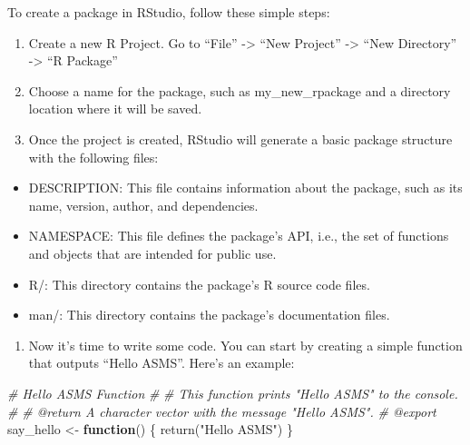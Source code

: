 \documentclass[
]{book}
\newenvironment{Shaded}{\begin{snugshade}}{\end{snugshade}}
\newcommand{\CommentTok}[1]{\textcolor[rgb]{0.56,0.35,0.01}{\textit{#1}}}
\newcommand{\ControlFlowTok}[1]{\textcolor[rgb]{0.13,0.29,0.53}{\textbf{#1}}}
\newcommand{\FunctionTok}[1]{\textcolor[rgb]{0.00,0.00,0.00}{#1}}
\newcommand{\NormalTok}[1]{#1}
\newcommand{\OtherTok}[1]{\textcolor[rgb]{0.56,0.35,0.01}{#1}}
\newcommand{\StringTok}[1]{\textcolor[rgb]{0.31,0.60,0.02}{#1}}
\providecommand{\tightlist}{%
  \setlength{\itemsep}{0pt}\setlength{\parskip}{0pt}}
\begin{document}
To create a package in RStudio, follow these simple steps:

\begin{enumerate}
\def\labelenumi{\arabic{enumi}.}
\tightlist
\item
  Create a new R Project. Go to ``File'' -\textgreater{} ``New Project'' -\textgreater{} ``New Directory'' -\textgreater{} ``R Package''
\item
  Choose a name for the package, such as my\_new\_rpackage and a directory location where it will be saved.
\item
  Once the project is created, RStudio will generate a basic package structure with the following files:
\end{enumerate}

\begin{itemize}
\tightlist
\item
  DESCRIPTION: This file contains information about the package, such as its name, version, author, and dependencies.
\item
  NAMESPACE: This file defines the package's API, i.e., the set of functions and objects that are intended for public use.
\item
  R/: This directory contains the package's R source code files.
\item
  man/: This directory contains the package's documentation files.
\end{itemize}

\begin{enumerate}
\def\labelenumi{\arabic{enumi}.}
\tightlist
\item
  Now it's time to write some code. You can start by creating a simple function that outputs ``Hello ASMS''. Here's an example:
\end{enumerate}

\begin{Shaded}
\begin{Highlighting}[]
\CommentTok{\#\textquotesingle{} Hello ASMS Function}
\CommentTok{\#\textquotesingle{}}
\CommentTok{\#\textquotesingle{} This function prints "Hello ASMS" to the console.}
\CommentTok{\#\textquotesingle{}}
\CommentTok{\#\textquotesingle{} @return A character vector with the message "Hello ASMS".}
\CommentTok{\#\textquotesingle{} @export}
\NormalTok{say\_hello }\OtherTok{\textless{}{-}} \ControlFlowTok{function}\NormalTok{() \{}
  \FunctionTok{return}\NormalTok{(}\StringTok{"Hello ASMS"}\NormalTok{)}
\NormalTok{\}}
\end{Highlighting}
\end{Shaded}
\end{document}
